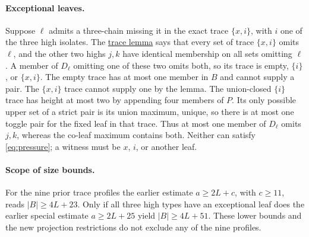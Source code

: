\documentclass[11pt,letterpaper]{article}
\begin{document}
\paragraph{Exceptional leaves.}
Suppose \(\ell\) admits a three-chain missing it in the exact
trace \(\{x,i\}\), with \(i\) one of the three high isolates.
The \href{https://github.com/Aafimalek/novel-discoveries/tree/97b848d070a6d61545e0add563abe3d82bb3532a/frankl-height-six/verification/four-isolate-leaf-deficient}{trace lemma}
says that every set of trace \(\{x,i\}\) omits \(\ell\),
and the other two highs \(j,k\) have identical membership on
all sets omitting \(\ell\). A member of \(D_\ell\) omitting
one of these two omits both, so its trace is empty, \(\{i\}\), or
\(\{x,i\}\). The empty trace has at most one member in \(B\)
and cannot supply a pair. The \(\{x,i\}\) trace cannot supply one
by the lemma. The union-closed \(\{i\}\) trace has height at most
two by appending four members of \(P\). Its only possible upper
set of a strict pair is its union maximum, unique, so there is
at most one toggle pair for the fixed leaf in that trace.
Thus at most one member of \(D_\ell\) omits \(j,k\), whereas
the co-leaf maximum contains both. Neither can satisfy
\eqref{eq:pressure}; a witness must be \(x\), \(i\), or another leaf.

\paragraph{Scope of size bounds.}
For the nine prior trace profiles the earlier estimate
\(a\ge2L+c\), with \(c\ge11\), reads \(|B|\ge4L+23\).
Only if all three high types have an exceptional leaf does the
earlier special estimate \(a\ge2L+25\) yield \(|B|\ge4L+51\).
These lower bounds and the new projection restrictions do not
exclude any of the nine profiles.
\end{document}

